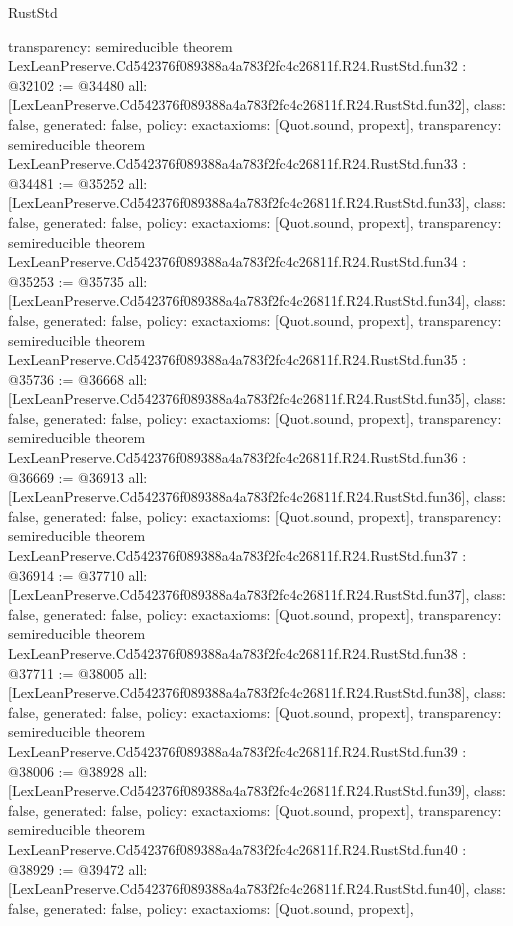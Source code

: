 \begin{lexlean}{RustStd}
\begin{coremodule}
{  transparency: semireducible
}
theorem LexLeanPreserve.Cd542376f089388a4a783f2fc4c26811f.R24.RustStd.fun32 : @32102 := @34480 {
  all: [LexLeanPreserve.Cd542376f089388a4a783f2fc4c26811f.R24.RustStd.fun32],
  class: false,
  generated: false,
  policy: exact{axioms: [Quot.sound, propext]},
  transparency: semireducible
}
theorem LexLeanPreserve.Cd542376f089388a4a783f2fc4c26811f.R24.RustStd.fun33 : @34481 := @35252 {
  all: [LexLeanPreserve.Cd542376f089388a4a783f2fc4c26811f.R24.RustStd.fun33],
  class: false,
  generated: false,
  policy: exact{axioms: [Quot.sound, propext]},
  transparency: semireducible
}
theorem LexLeanPreserve.Cd542376f089388a4a783f2fc4c26811f.R24.RustStd.fun34 : @35253 := @35735 {
  all: [LexLeanPreserve.Cd542376f089388a4a783f2fc4c26811f.R24.RustStd.fun34],
  class: false,
  generated: false,
  policy: exact{axioms: [Quot.sound, propext]},
  transparency: semireducible
}
theorem LexLeanPreserve.Cd542376f089388a4a783f2fc4c26811f.R24.RustStd.fun35 : @35736 := @36668 {
  all: [LexLeanPreserve.Cd542376f089388a4a783f2fc4c26811f.R24.RustStd.fun35],
  class: false,
  generated: false,
  policy: exact{axioms: [Quot.sound, propext]},
  transparency: semireducible
}
theorem LexLeanPreserve.Cd542376f089388a4a783f2fc4c26811f.R24.RustStd.fun36 : @36669 := @36913 {
  all: [LexLeanPreserve.Cd542376f089388a4a783f2fc4c26811f.R24.RustStd.fun36],
  class: false,
  generated: false,
  policy: exact{axioms: [Quot.sound, propext]},
  transparency: semireducible
}
theorem LexLeanPreserve.Cd542376f089388a4a783f2fc4c26811f.R24.RustStd.fun37 : @36914 := @37710 {
  all: [LexLeanPreserve.Cd542376f089388a4a783f2fc4c26811f.R24.RustStd.fun37],
  class: false,
  generated: false,
  policy: exact{axioms: [Quot.sound, propext]},
  transparency: semireducible
}
theorem LexLeanPreserve.Cd542376f089388a4a783f2fc4c26811f.R24.RustStd.fun38 : @37711 := @38005 {
  all: [LexLeanPreserve.Cd542376f089388a4a783f2fc4c26811f.R24.RustStd.fun38],
  class: false,
  generated: false,
  policy: exact{axioms: [Quot.sound, propext]},
  transparency: semireducible
}
theorem LexLeanPreserve.Cd542376f089388a4a783f2fc4c26811f.R24.RustStd.fun39 : @38006 := @38928 {
  all: [LexLeanPreserve.Cd542376f089388a4a783f2fc4c26811f.R24.RustStd.fun39],
  class: false,
  generated: false,
  policy: exact{axioms: [Quot.sound, propext]},
  transparency: semireducible
}
theorem LexLeanPreserve.Cd542376f089388a4a783f2fc4c26811f.R24.RustStd.fun40 : @38929 := @39472 {
  all: [LexLeanPreserve.Cd542376f089388a4a783f2fc4c26811f.R24.RustStd.fun40],
  class: false,
  generated: false,
  policy: exact{axioms: [Quot.sound, propext]},
}
\end{coremodule}
\end{lexlean}
